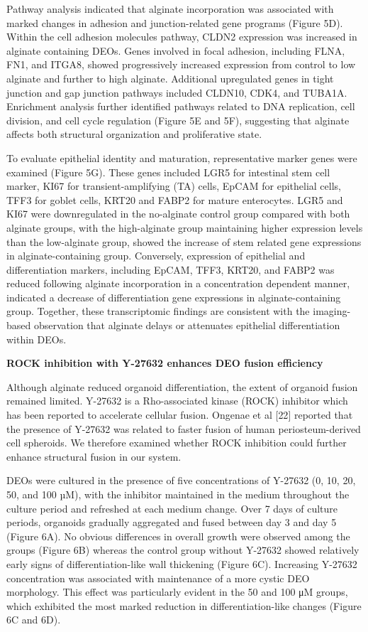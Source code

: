 \documentclass[
]{article}
\begin{document}
Pathway analysis indicated that alginate incorporation was associated with marked changes in adhesion and junction-related gene programs (Figure 5D). Within the cell adhesion molecules pathway, CLDN2 expression was increased in alginate containing DEOs. Genes involved in focal adhesion, including FLNA, FN1, and ITGA8, showed progressively increased expression from control to low alginate and further to high alginate. Additional upregulated genes in tight junction and gap junction pathways included CLDN10, CDK4, and TUBA1A. Enrichment analysis further identified pathways related to DNA replication, cell division, and cell cycle regulation (Figure 5E and 5F), suggesting that alginate affects both structural organization and proliferative state.

To evaluate epithelial identity and maturation, representative marker genes were examined (Figure 5G). These genes included LGR5 for intestinal stem cell marker, KI67 for transient-amplifying (TA) cells, EpCAM for epithelial cells, TFF3 for goblet cells, KRT20 and FABP2 for mature enterocytes. LGR5 and KI67 were downregulated in the no-alginate control group compared with both alginate groups, with the high-alginate group maintaining higher expression levels than the low-alginate group, showed the increase of stem related gene expressions in alginate-containing group. Conversely, expression of epithelial and differentiation markers, including EpCAM, TFF3, KRT20, and FABP2 was reduced following alginate incorporation in a concentration dependent manner, indicated a decrease of differentiation gene expressions in alginate-containing group. Together, these transcriptomic findings are consistent with the imaging-based observation that alginate delays or attenuates epithelial differentiation within DEOs.

\textbf{ROCK inhibition with Y-27632 enhances DEO fusion efficiency}

Although alginate reduced organoid differentiation, the extent of organoid fusion remained limited. Y-27632 is a Rho-associated kinase (ROCK) inhibitor which has been reported to accelerate cellular fusion. Ongenae et al {[}22{]} reported that the presence of Y-27632 was related to faster fusion of human periosteum-derived cell spheroids. We therefore examined whether ROCK inhibition could further enhance structural fusion in our system.

DEOs were cultured in the presence of five concentrations of Y-27632 (0, 10, 20, 50, and 100 µM), with the inhibitor maintained in the medium throughout the culture period and refreshed at each medium change. Over 7 days of culture periods, organoids gradually aggregated and fused between day 3 and day 5 (Figure 6A). No obvious differences in overall growth were observed among the groups (Figure 6B) whereas the control group without Y-27632 showed relatively early signs of differentiation-like wall thickening (Figure 6C). Increasing Y-27632 concentration was associated with maintenance of a more cystic DEO morphology. This effect was particularly evident in the 50 and 100 μM groups, which exhibited the most marked reduction in differentiation-like changes (Figure 6C and 6D).
\end{document}
